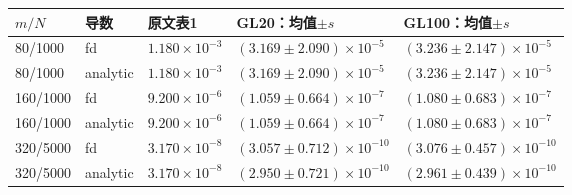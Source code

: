 \begin{tabular}{lllll}\toprule
$m/N$ & 导数 & 原文表1 & GL20：均值$\pm s$ & GL100：均值$\pm s$ \\ \midrule
80/1000 & fd & $1.180\times10^{-3}$ & $(3.169\pm2.090)\times10^{-5}$ & $(3.236\pm2.147)\times10^{-5}$ \\
80/1000 & analytic & $1.180\times10^{-3}$ & $(3.169\pm2.090)\times10^{-5}$ & $(3.236\pm2.147)\times10^{-5}$ \\
160/1000 & fd & $9.200\times10^{-6}$ & $(1.059\pm0.664)\times10^{-7}$ & $(1.080\pm0.683)\times10^{-7}$ \\
160/1000 & analytic & $9.200\times10^{-6}$ & $(1.059\pm0.664)\times10^{-7}$ & $(1.080\pm0.683)\times10^{-7}$ \\
320/5000 & fd & $3.170\times10^{-8}$ & $(3.057\pm0.712)\times10^{-10}$ & $(3.076\pm0.457)\times10^{-10}$ \\
320/5000 & analytic & $3.170\times10^{-8}$ & $(2.950\pm0.721)\times10^{-10}$ & $(2.961\pm0.439)\times10^{-10}$ \\
\bottomrule\end{tabular}
